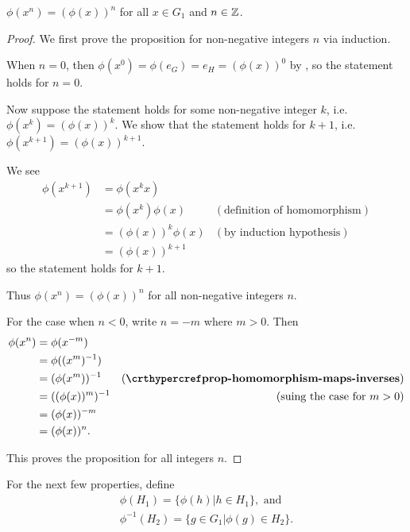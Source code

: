 \begin{proposition}
    $\phi(x^n) = (\phi(x))^n$ for all $x \in G_1$ and $n \in \mathbb{Z}$.
\end{proposition}
\begin{proof}
    We first prove the proposition for non-negative integers $n$ via induction.

    When $n = 0$, then $\phi(x^0) = \phi(e_G) = e_H = (\phi(x))^0$ by , so the statement holds for $n = 0$.

    Now suppose the statement holds for some non-negative integer $k$, i.e. $\phi(x^k) = (\phi(x))^k$. We show that the statement holds for $k + 1$, i.e. $\phi(x^{k+1}) = (\phi(x))^{k+1}$.

    We see
    \begin{align*}
        \phi(x^{k+1}) &= \phi(x^kx) \\
        &= \phi(x^k)\phi(x) & (\text{definition of homomorphism})\\
        &= (\phi(x))^k\phi(x) & (\text{by induction hypothesis})\\
        &= (\phi(x))^{k+1}
    \end{align*}
    so the statement holds for $k+1$.

    Thus $\phi(x^n) = (\phi(x))^n$ for all non-negative integers $n$.

    For the case when $n < 0$, write $n = -m$ where $m > 0$. Then
    \begin{align*}
        \phi(x^n) &= \phi(x^{-m})\\
        &= \phi((x^m)^{-1})\\
        &= (\phi(x^m))^{-1} & (\myref{prop-homomorphism-maps-inverses})\\
        &= ((\phi(x))^m)^{-1} & (\text{suing the case for } m>0)\\
        &= (\phi(x))^{-m}\\
        &= (\phi(x))^n.
    \end{align*}

    This proves the proposition for all integers $n$.
\end{proof}

For the next few properties, define
\begin{gather*}
    \phi(H_1) = \{\phi(h) \vert h \in H_1\}, \text{ and}\\
    \phi^{-1}(H_2) = \{g \in G_1 \vert \phi(g) \in H_2\}.
\end{gather*}

